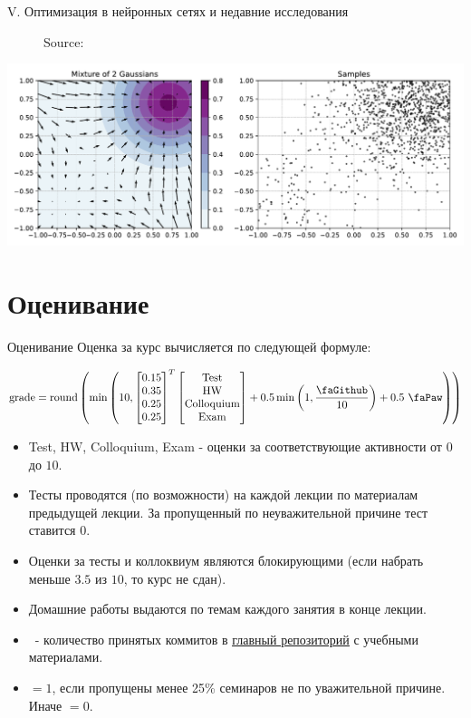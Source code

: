 \documentclass[9pt, aspectratio=169]{beamer}
\begin{document}
\begin{frame}{V. Оптимизация в нейронных сетях и недавние исследования}
\begin{minipage}{0.382\textwidth}
\begin{figure}
            \caption{Source: \cite{belkin2019reconciling}}
        \end{figure}
        \centering
        \includegraphics[width=\linewidth]{diff.pdf}
    \end{minipage}
\end{frame}

\section{Оценивание}
\begin{frame}{Оценивание}
    Оценка за курс вычисляется по следующей формуле:

    $$
    \text{grade} = \text{round}\left(\min\left(10, \begin{bmatrix}
        0.15 \\ 0.35 \\ 0.25 \\ 0.25
    \end{bmatrix}^T \begin{bmatrix}
        \text{Test} \\ \text{HW} \\ \text{Colloquium} \\ \text{Exam}
    \end{bmatrix} + 0.5\min \left(1, \dfrac{\text{\faGithub}}{10}\right)+ 0.5 \text{ \faPaw}\right)\right)
    $$

    \begin{itemize}
        \item Test, HW, Colloquium, Exam - оценки за соответствующие активности от $0$ до $10$.
        \item Тесты проводятся (по возможности) на каждой лекции по материалам предыдущей лекции. За пропущенный по неуважительной причине тест ставится $0$. 
        \item Оценки за тесты и коллоквиум являются блокирующими (если набрать меньше $3.5$ из $10$, то курс не сдан). 
        \item Домашние работы выдаются по темам каждого занятия в конце лекции.
        \item \faGithub~- количество принятых коммитов в \underline{\href{https://github.com/MerkulovDaniil/optim}{главный репозиторий}} с учебными материалами.
        \item \faPaw \; $=1$, если пропущены менее 25\% семинаров не по уважительной причине. Иначе \faPaw \;$=0$.
    \end{itemize}
    
\end{frame}
\end{document}
